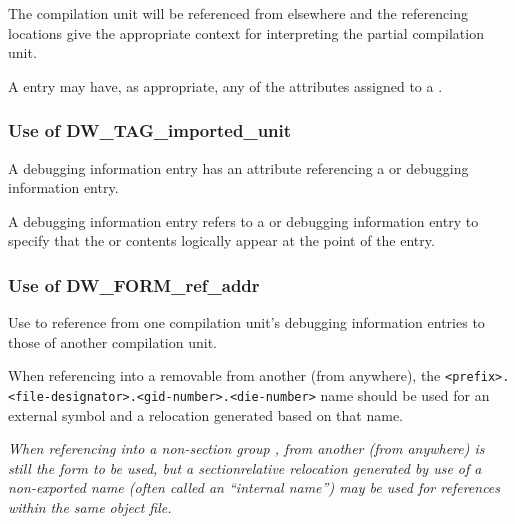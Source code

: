 The  compilation unit will be referenced
from elsewhere and the referencing locations give the
appropriate context for interpreting the partial compilation
unit.

A  entry may have, as appropriate, any of
the attributes assigned to a .


\subsubsection{Use of DW\_TAG\_imported\_unit}

A  debugging information entry has an
 attribute referencing a  or
 debugging information entry.

A  debugging information entry refers
to a 
 or 
 debugging
information entry to specify that the 
 or
 contents logically appear at the point
of the 
 entry.


\subsubsection{Use of DW\_FORM\_ref\_addr}

Use 
 to reference from one compilation
unit's debugging information entries to those of another
compilation unit.

When referencing into a removable 
from another  (from anywhere), the
\texttt{<prefix>.<file-designator>.<gid-number>.<die-number>}
name should be used for an external symbol and a relocation
generated based on that name.

\textit{When referencing into a 
non-section group 
,
from another  (from anywhere) 
 is
still the form to be used, but a section\dash relative relocation
generated by use of a non-exported name (often called an
``internal name'') may be used for references within the
same object file.}

